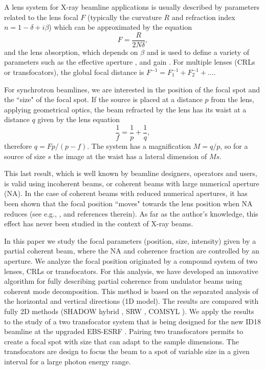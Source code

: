 \documentclass{iucr}              %
\begin{document}
A lens system for X-ray beamline applications is usually described by parameters related to the lens focal $F$ (typically the curvature $R$ and refraction index $n=1-\delta+i\beta$) which can be approximated by the equation
\begin{equation}
    \label{eq:F}
    F=\frac{R}{2 N \delta},
\end{equation}
and the lens absorption, which depends on $\beta$ and is used to define a variety of parameters such as the effective aperture \cite{XX}, and gain \cite{XX}. For multiple lenses (CRLs or transfocators), the global focal distance is $F^{-1}=F_1^{-1}+F_2^{-1}+...$. 

For synchrotron beamlines, we are interested in the position of the focal spot and the ``size" of the focal spot. If the source is placed at a distance $p$ from the lens, applying geometrical optics, the beam refracted by the lens has its waist at a distance $q$ given by the lens equation
\begin{equation}
    \label{eq:lens}
    \frac{1}{f} = \frac{1}{p} + \frac{1}{q},
\end{equation}
therefore $q=F p / (p-f)$. The system has a magnification $M=q/p$, so for a source of size $s$ the image at the waist has a lateral dimension of $Ms$. 

This last result, which is well known by beamline designers, operators and users, is valid using incoherent beams, or coherent beams with large numerical aperture (NA). In the case of coherent beams with reduced numerical apertures, it has been shown that the focal position ``moves" towards the lens position when NA reduces (see e.g., \cite{Tanaka:85}, and references therein). As far as the author's knowledge, this effect has never been studied in the context of X-ray beams. 

In this paper we study the focal parameters (position, size, intensity) given by a partial coherent beam, where the NA and coherence fraction are controlled by an aperture. We analyze the focal position originated by a compound system of two lenses, CRLs or transfocators. For this analysis, we have developed an innovative algorithm for fully describing partial coherence from undulator beams using coherent mode decomposition. This method is based on the separated analysis of the horizontal and vertical directions (1D model). The results are compared with fully 2D methods (SHADOW hybrid \cite{XX}, SRW \cite{XX}, COMSYL \cite{XX}). We apply the results to the study of a two transfocator system that is being designed for the new ID18 beamline at the upgraded EBS-ESRF \cite{XX}.  
Pairing two transfocators permits to create a focal spot with size that can adapt to the sample dimensions. The transfocators are design to focus the beam to a spot of variable size in a given interval for a large photon energy range. 
\end{document}
